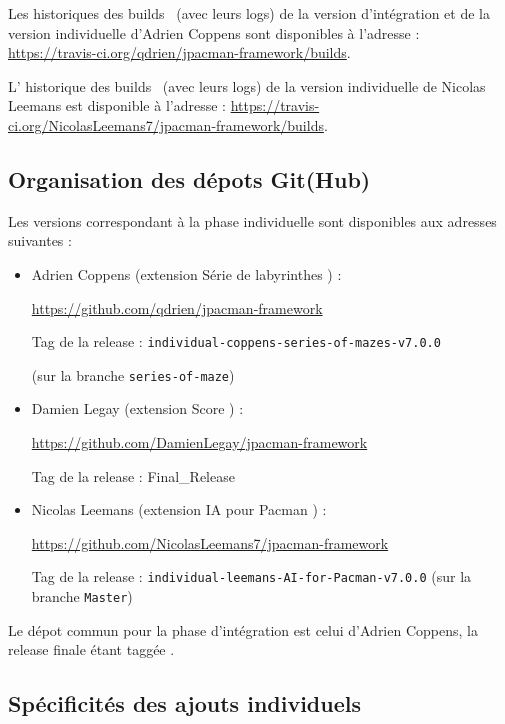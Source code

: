 \documentclass[12pt, openany]{report}
\begin{document}
Les historiques des \og builds \fg \, (avec leurs logs) de la version d'intégration et de la version individuelle d'Adrien Coppens sont disponibles à l'adresse : \url{https://travis-ci.org/qdrien/jpacman-framework/builds}.

L' historique des \og builds \fg \, (avec leurs logs) de la version individuelle de Nicolas Leemans est disponible à l'adresse : \url{https://travis-ci.org/NicolasLeemans7/jpacman-framework/builds}.

\subsection{Organisation des dépots Git(Hub)}
Les versions correspondant à la phase individuelle sont disponibles aux adresses suivantes :
\begin{itemize}
	\item Adrien Coppens (extension \og Série de labyrinthes \fg ) : 
	
	\url{https://github.com/qdrien/jpacman-framework}
	
	Tag de la release : \nolinkurl{individual-coppens-series-of-mazes-v7.0.0}
	
	(sur la branche \nolinkurl{series-of-maze})
	\item Damien Legay (extension \og Score \fg ) : 
	
	\url{https://github.com/DamienLegay/jpacman-framework}
	
	Tag de la release : \nolinkurl{}{Final\_Release}
	\item Nicolas Leemans (extension \og IA pour Pacman \fg ) : 
	
	\url{https://github.com/NicolasLeemans7/jpacman-framework}
	
	Tag de la release : \nolinkurl{individual-leemans-AI-for-Pacman-v7.0.0}
	(sur la branche \nolinkurl{Master})
\end{itemize}

Le dépot commun pour la phase d'intégration est celui d'Adrien Coppens, la release finale étant taggée \nolinkurl{}. %



\subsection{Spécificités des ajouts individuels}
\end{document}
